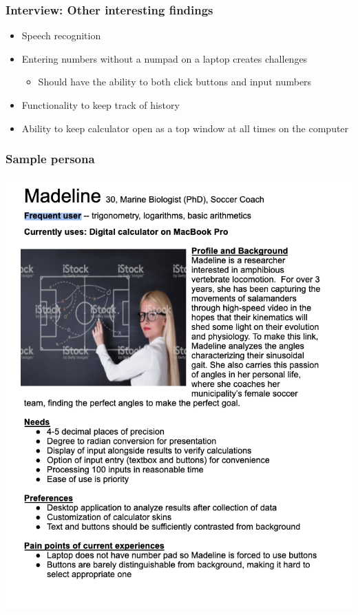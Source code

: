 \documentclass{beamer}
\begin{document}
  \begin{frame}
  \frametitle{Interview: Other interesting findings}
  \begin{itemize}
   \item Speech recognition
   \item Entering numbers without a numpad on a laptop creates challenges
       \begin{itemize}
     \item Should have the ability to both click buttons and input numbers
    \end{itemize}
   \item Functionality to keep track of history
   \item Ability to keep calculator open as a top window at all times on the computer
  \end{itemize}
  \end{frame}
  
  \begin{frame}
  \frametitle{Sample persona}
  \begin{center}
    \includegraphics[scale=0.5]{Persona}
\end{center}
  \end{frame}
\end{document}
